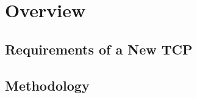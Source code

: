 \section{Overview}
\label{sec:overview} 
\subsection{Requirements of a New TCP}
\label{ssec:requirements} 
\subsection{Methodology}
\label{ssec:methodology} 
